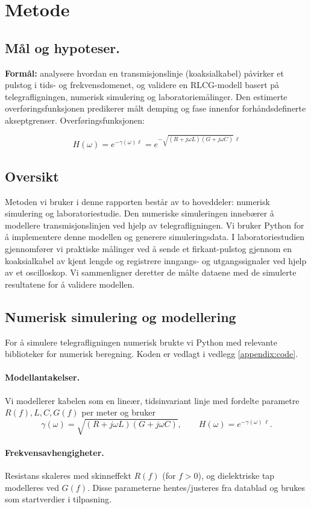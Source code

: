 \section{Metode}

\subsection{Mål og hypoteser.}
\textbf{Formål:} analysere hvordan en transmisjonslinje (koaksialkabel) påvirker et pulstog i tids- og frekvensdomenet, og validere en RLCG-modell basert på telegrafligningen, numerisk simulering og laboratoriemålinger. Den estimerte overføringsfunksjonen predikerer målt demping og fase innenfor forhåndsdefinerte akseptgrenser. Overføringsfunksjonen:

\[
H(\omega) = e^{-\gamma(\omega)\ell} = e^{-\sqrt{(R+j\omega L)(G+j\omega C)}\,\ell}
\]

\subsection{Oversikt}
Metoden vi bruker i denne rapporten består av to hoveddeler: numerisk simulering og laboratoriestudie. Den numeriske simuleringen innebærer å modellere transmisjonslinjen ved hjelp av telegrafligningen. Vi bruker Python for å implementere denne modellen og generere simuleringsdata. I laboratoriestudien gjennomfører vi praktiske målinger ved å sende et firkant-pulstog gjennom en koaksialkabel av kjent lengde og registrere inngangs- og utgangssignaler ved hjelp av et oscilloskop. Vi sammenligner deretter de målte dataene med de simulerte resultatene for å validere modellen.

\subsection{Numerisk simulering og modellering}
For å simulere telegrafligningen numerisk brukte vi Python med relevante biblioteker for numerisk beregning. Koden er vedlagt i vedlegg \ref{appendix:code}.
\paragraph{Modellantakelser.}
Vi modellerer kabelen som en lineær, tidsinvariant linje med fordelte parametre $R(f),L,C,G(f)$ per meter og bruker
\[
\gamma(\omega)=\sqrt{(R+j\omega L)(G+j\omega C)},\qquad
H(\omega)=e^{-\gamma(\omega)\,\ell}.
\]

\paragraph{Frekvensavhengigheter.}
Resistans skaleres med skinneffekt $R(f)$ (for $f>0$), og dielektriske tap modelleres ved
$G(f)$. Disse parameterne hentes/justeres fra datablad og brukes som startverdier i tilpasning.

